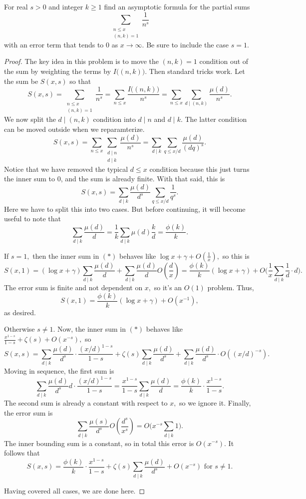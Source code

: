 \begin{exercise}
For real $s>0$ and integer $k\ge1$ find an asymptotic formula for the partial sums
\[\sum_{\substack{n\le x\\(n,k)=1}}\frac1{n^s}\]
with an error term that tends to $0$ as $x\to\infty.$ Be sure to include the case $s=1.$
\end{exercise}

\begin{proof}
The key idea in this problem is to move the $(n,k)=1$ condition out of the sum by weighting the terms by $I\big((n,k)\big).$ Then standard tricks work. Let the sum be $S(x,s)$ so that
\[S(x,s)=\sum_{\substack{n\le x\\(n,k)=1}}\frac1{n^s}=\sum_{n\le x}\frac{I\big((n,k)\big)}{n^s}=\sum_{n\le x}\sum_{d\mid(n,k)}\frac{\mu(d)}{n^s}.\]
We now split the $d\mid(n,k)$ condition into $d\mid n$ and $d\mid k.$ The latter condition can be moved outside when we reparamterize.
\[S(x,s)=\sum_{n\le x}\sum_{\substack{d\mid n\\d\mid k}}\frac{\mu(d)}{n^s}=\sum_{d\mid k}\sum_{q\le x/d}\frac{\mu(d)}{(dq)^s}.\]
Notice that we have removed the typical $d\le x$ condition because this just turns the inner sum to 0, and the sum is already finite. With that said, this is
\[S(x,s)=\sum_{d\mid k}\frac{\mu(d)}{d^s}\sum_{q\le x/d}\frac1{q^s}.\tag{$*$}\]
Here we have to split this into two cases. But before continuing, it will become useful to note that
\[\sum_{d\mid k}\frac{\mu(d)}d=\frac1k\sum_{d\mid k}\mu(d)\frac kd=\frac{\phi(k)}k.\]

If $s=1,$ then the inner sum in $(*)$ behaves like $\log x+\gamma+O\left(\frac1x\right),$ so this is
\[S(x,1)=(\log x+\gamma)\sum_{d\mid k}\frac{\mu(d)}d+\sum_{d\mid k}\frac{\mu(d)}dO\left(\frac dx\right)=\frac{\phi(k)}k(\log x+\gamma)+O\Bigg(\frac1x\sum_{d\mid k}\frac1d\cdot d\Bigg).\]
The error sum is finite and not dependent on $x,$ so it's an $O(1)$ problem. Thus,
\[\boxed{S(x,1)=\frac{\phi(k)}k(\log x+\gamma)+O\left(x^{-1}\right)},\]
as desired.

Otherwise $s\ne1.$ Now, the inner sum in $(*)$ behaves like $\frac{x^{1-s}}{1-s}+\zeta(s)+O\left(x^{-s}\right),$ so
\[S(x,s)=\sum_{d\mid k}\frac{\mu(d)}{d^s}\cdot\frac{(x/d)^{1-s}}{1-s}+\zeta(s)\sum_{d\mid k}\frac{\mu(d)}{d^s}+\sum_{d\mid k}\frac{\mu(d)}{d^s}\cdot O\left((x/d)^{-s}\right).\]
Moving in sequence, the first sum is
\[\sum_{d\mid k}\frac{\mu(d)}{d^s}d\cdot\frac{(x/d)^{1-s}}{1-s}=\frac{x^{1-s}}{1-s}\sum_{d\mid k}\frac{\mu(d)}d=\frac{\phi(k)}k\cdot\frac{x^{1-s}}{1-s}.\]
The second sum is already a constant with respect to $x,$ so we ignore it. Finally, the error sum is
\[\sum_{d\mid k}\frac{\mu(s)}{d^s}O\left(\frac{d^s}{x^s}\right)=O\Bigg(x^{-s}\sum_{d\mid k}1\Bigg).\]
The inner bounding sum is a constant, so in total this error is $O\left(x^{-s}\right).$ It follows that
\[\boxed{S(x,s)=\frac{\phi(k)}k\cdot\frac{x^{1-s}}{1-s}+\zeta(s)\sum_{d\mid k}\frac{\mu(d)}{d^s}+O\left(x^{-s}\right)\text{ for }s\ne1}.\]

Having covered all cases, we are done here.
\end{proof}

